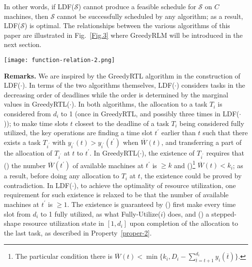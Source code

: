 \documentclass[10pt,journal,compsoc]{IEEEtran}
\newcommand{\rmnum}[1]{\romannumeral #1}
\begin{document}
In other words, if LDF($\mathcal{S}$) cannot produce a feasible schedule for $\mathcal{S}$ on $C$ machines, then $\mathcal{S}$ cannot be successfully scheduled by any algorithm; as a result, LDF($\mathcal{S}$) is optimal. The relationships between the various algorithms of this paper are illustrated in Fig.~\ref{Fig.3} where GreedyRLM will be introduced in the next section. 




\begin{figure*}[!ht]
\centering

\texttt{[image: function-relation-2.png]}

  \caption{Relationship among Algorithms: for $A\rightarrow B$, the blue and green arrows denote the relations that the algorithm $A$ calls $B$, and, the algorithm $B$ is executed upon completion of $A$.}\label{Fig.3}
\end{figure*}






\vspace{0.2em}\noindent\textbf{Remarks.} We are inspired by the GreedyRTL algorithm \cite{Jain} in the construction of LDF($\cdot$). In terms of the two algorithms themselves, LDF($\cdot$) considers tasks in the decreasing order of deadlines while the order is determined by the marginal values in GreedyRTL($\cdot$). In both algorithms, the allocation to a task $T_{i}$ is considered from $d_{i}$ to 1 (once in GreedyRTL, and possibly three times in LDF($\cdot$)); to make time slots $t$ closest to the deadline of a task $T_{i}$ being considered fully utilized, the key operations are finding a time slot $t^{\prime}$ earlier than $t$ such that there exists a task $T_{i^{\prime}}$ with $y_{i^{\prime}}(t)>y_{i^{\prime}}(t^{\prime})$ when $\overline{W}(t)$, and transferring a part of the allocation of $T_{i^{\prime}}$ at $t$ to $t^{\prime}$. In GreedyRTL($\cdot$), the existence of $T_{i^{\prime}}$ requires that (\rmnum{1}) the number $\overline{W}(t^{\prime})$ of available machines at $t^{\prime}$ is $\geq k$ and (\rmnum{2})\footnote{The particular condition there is $\overline{W}(t) < \min\{ k_{i}, D_{i}-\sum_{\overline{t}=t+1}^{d_{i}}{y_{i}(\overline{t})} \}$.} $\overline{W}(t) < k_{i}$; as a result, before doing any allocation to $T_{i}$ at $t$, the existence could be proved by contradiction. In LDF($\cdot$), to achieve the optimality of resource utilization, one requirement for such existence is relaxed to be that the number of available machines at $t^{\prime}$ is $\geq 1$. The existence is guaranteed by (\rmnum{1}) first make every time slot from $d_{i}$ to 1 fully utilized, as what Fully-Utilize($i$) does, and (\rmnum{2}) a stepped-shape resource utilization state in $[1, d_{i}]$ upon completion of the allocation to the last task, as described in Property~\ref{proper-2}.
\end{document}
